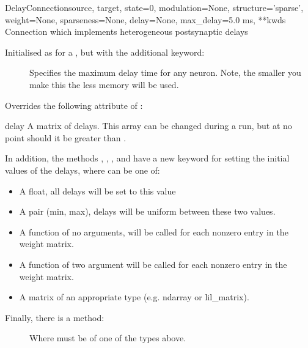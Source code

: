 \documentclass[letterpaper,10pt,english]{manual}
\begin{document}
\hypertarget{brian.DelayConnection}{}\begin{classdesc}{DelayConnection}{source, target, state=0, modulation=None, structure='sparse', weight=None, sparseness=None, delay=None, max\_delay=5.0 ms, **kwds}
Connection which implements heterogeneous postsynaptic delays

Initialised as for a \hyperlink{brian.Connection}{}, but with the additional
keyword:
\begin{description}
\item[] \leavevmode
Specifies the maximum delay time for any
neuron. Note, the smaller you make this the less memory will be
used.

\end{description}

Overrides the following attribute of \hyperlink{brian.Connection}{}:

\hypertarget{brian.DelayConnection.delay}{}\begin{memberdesc}{delay}
A matrix of delays. This array can be changed during a run,
but at no point should it be greater than .
\end{memberdesc}

In addition, the methods , , ,
and  have a new keyword  for setting the
initial values of the delays, where  can be one of:
\begin{itemize}
\item {} 
A float, all delays will be set to this value

\item {} 
A pair (min, max), delays will be uniform between these two
values.

\item {} 
A function of no arguments, will be called for each nonzero
entry in the weight matrix.

\item {} 
A function of two argument  will be called for each
nonzero entry in the weight matrix.

\item {} 
A matrix of an appropriate type (e.g. ndarray or lil\_matrix).

\end{itemize}

Finally, there is a method:
\begin{description}
\item[] \leavevmode
Where  must be of one of the types above.


\end{description}
\end{classdesc}
\end{document}
